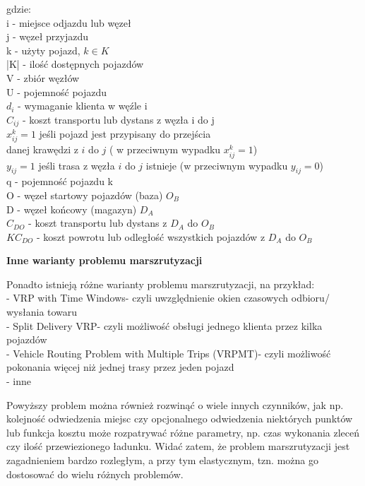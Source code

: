 \documentclass[a4paper, twoside, 12pt, justified]{article}
\begin{document}
	gdzie:\\
	i - miejsce odjazdu lub węzeł\\
	j - węzeł przyjazdu\\
	k - użyty pojazd, $k \in K$\\
	|K| - ilość dostępnych pojazdów\\
	V - zbiór węzłów\\
	U - pojemność pojazdu\\
	$d_{i}$ - wymaganie klienta w węźle i\\
	$C_{ij}$ - koszt transportu lub dystans z węzła i do j\\
	$x_{ij}^{k} = 1$ jeśli pojazd jest przypisany do przejścia\\ danej krawędzi z $i$ do $j$ ( w przeciwnym wypadku $x_{ij}^{k} = 1$)\\
	$y_{ij} = 1$ jeśli trasa z węzła $i$ do $j$ istnieje (w przeciwnym wypadku $y_{ij} = 0$)\\
	q - pojemność pojazdu k\\
	O - węzeł startowy pojazdów (baza) $O_B$\\
	D - węzeł końcowy (magazyn) $D_A$\\
	$C_{DO}$ - koszt transportu lub dystans z $D_A$ do $O_B$\\
	$KC_{DO}$ - koszt powrotu lub odległość wszystkich pojazdów z $D_A$ do $O_B$\\
	
	\begin{large}
		\begin{center}
			\textbf{Inne warianty problemu marszrutyzacji}
		\end{center}
	\end{large} 
	
	
	Ponadto istnieją różne warianty problemu marszrutyzacji, na przykład:\\ 
	- VRP with Time Windows- czyli uwzględnienie okien czasowych odbioru/ wysłania towaru\\
	- Split Delivery VRP- czyli możliwość obsługi jednego klienta przez kilka pojazdów\\
	- Vehicle Routing Problem with Multiple Trips (VRPMT)- czyli możliwość pokonania więcej niż jednej trasy przez jeden pojazd\\
	- inne
	
	\vspace{5mm} %
	
	Powyższy problem można również rozwinąć o wiele innych czynników, jak np. kolejność odwiedzenia miejsc czy opcjonalnego odwiedzenia niektórych punktów lub funkcja kosztu może rozpatrywać różne parametry, np. czas wykonania zleceń czy ilość przewiezionego ładunku. Widać zatem, że problem marszrutyzacji jest zagadnieniem bardzo rozległym, a przy tym elastycznym, tzn. można go dostosować do wielu różnych problemów.\\
	
\end{document}
